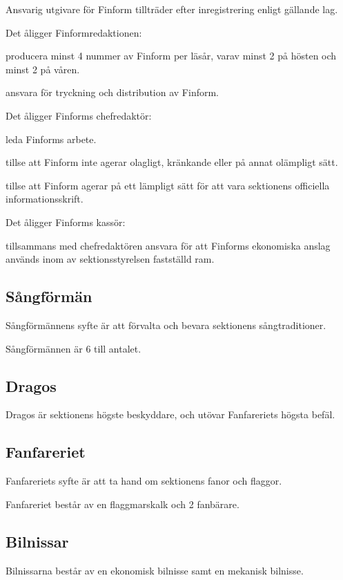 \documentclass{styrdokument}
\begin{document}
\? Ansvarig utgivare för Finform tillträder efter inregistrering enligt gällande lag.

\? Det åligger Finformredaktionen:
\begin{aligganden}
    \item producera minst 4 nummer av Finform per läsår, varav minst 2 på hösten och minst 2 på våren.
    \item ansvara för tryckning och distribution av Finform.
\end{aligganden}

\? Det åligger Finforms chefredaktör:
\begin{aligganden}
    \item leda Finforms arbete.
    \item tillse att Finform inte agerar olagligt, kränkande eller på annat olämpligt sätt.
    \item tillse att Finform agerar på ett lämpligt sätt för att vara sektionens officiella informationsskrift.
\end{aligganden}

\? Det åligger Finforms kassör:
\begin{aligganden}
    \item tillsammans med chefredaktören ansvara för att Finforms ekonomiska anslag används inom av sektionsstyrelsen fastställd ram.
\end{aligganden}

\subsection{Sångförmän}
\? Sångförmännens syfte är att förvalta och bevara sektionens sångtraditioner.

\? Sångförmännen är 6 till antalet.

\subsection{Dragos}
\? Dragos är sektionens högste beskyddare, och utövar Fanfareriets högsta befäl.

\subsection{Fanfareriet}
\? Fanfareriets syfte är att ta hand om sektionens fanor och flaggor.

\? Fanfareriet består av en flaggmarskalk och 2 fanbärare.

\subsection{Bilnissar}
\? Bilnissarna består av en ekonomisk bilnisse samt en mekanisk bilnisse.
\end{document}
